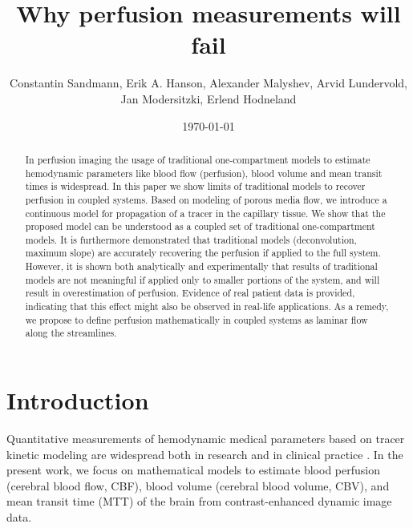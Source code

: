 \documentclass[journal,twocolumn]{IEEEtran}
\title{Why perfusion measurements will fail}
\author{Constantin Sandmann, Erik A. Hanson, Alexander Malyshev,  Arvid Lundervold, Jan Modersitzki, Erlend Hodneland }
\date{\today}
\begin{document}
	\maketitle

	\begin{abstract}
		In perfusion imaging the usage of traditional one-compartment models to estimate hemodynamic parameters like blood flow (perfusion), blood volume and mean transit times is widespread. In this paper we show limits of traditional models to recover perfusion in coupled systems. Based on modeling of porous media flow, we introduce a continuous model for propagation of a tracer in the capillary tissue. We show that the proposed model can be understood as a coupled set of traditional one-compartment models. It is furthermore demonstrated that traditional models (deconvolution, maximum slope) are accurately recovering the perfusion if applied to the full system. However, it is shown both analytically and experimentally that results of traditional models are not meaningful if applied only to smaller portions of the system, and will result in overestimation of perfusion. Evidence of real patient data is provided, indicating that this effect might also be observed in real-life applications.  As a remedy, we propose to define perfusion mathematically in coupled systems as laminar flow along the streamlines.
	\end{abstract}

	\section{Introduction}
	
	Quantitative measurements of hemodynamic medical parameters based on tracer kinetic modeling are widespread both in research and in clinical practice \cite{sourbron13}. 
	In the present work, we focus on mathematical models to estimate blood perfusion (cerebral blood flow, CBF), blood volume (cerebral blood volume, CBV), and mean transit time (MTT) of the brain from contrast-enhanced dynamic image data. 
\end{document}
